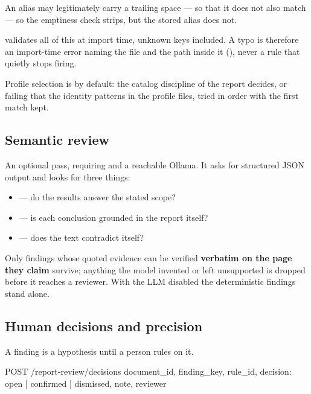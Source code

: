 An alias may legitimately carry a trailing space ---  so that it
does not also match  --- so the emptiness check strips, but the
stored alias does not.

 validates all of this at import time, unknown keys
included. A typo is therefore an import-time error naming the file and the path
inside it (), never a rule that quietly stops firing.

Profile selection is  by default: the catalog discipline of the
report decides, or failing that the identity patterns in the profile files,
tried in  order with the first match kept.

\subsection{Semantic review}

An optional pass, requiring  and a reachable Ollama. It asks
for structured JSON output and looks for three things:

\begin{itemize}
\item {} --- do the results answer the
stated scope?
\item {} --- is each conclusion grounded in
the report itself?
\item {} --- does the text contradict
itself?
\end{itemize}

Only findings whose quoted evidence can be verified \textbf{verbatim on the page
they claim} survive; anything the model invented or left unsupported is dropped
before it reaches a reviewer. With the LLM disabled the deterministic findings
stand alone.

\subsection{Human decisions and precision}

A finding is a hypothesis until a person rules on it.

\begin{shellblock}
POST /report-review/decisions
  {document_id, finding_key, rule_id,
   decision: open | confirmed | dismissed, note, reviewer}
\end{shellblock}


